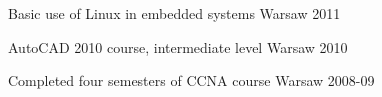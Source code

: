 

\begin{cvhonors}

  \cvhonor
    {Basic use of Linux in embedded systems} %
    {} %
    {Warsaw} %
    {2011}

  \cvhonor
    {AutoCAD 2010 course, intermediate level} %
    {} %
    {Warsaw} %
    {2010}

  \cvhonor
    {Completed four semesters of CCNA course} %
    {} %
    {Warsaw} %
    {2008-09}

\end{cvhonors}
